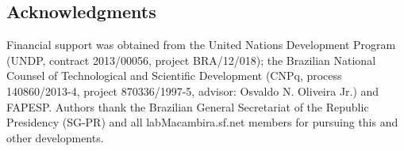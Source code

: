 \documentclass[a4paper, 11pt]{article} %
\begin{document}
\subsection*{Acknowledgments}
Financial support was obtained from 
the United Nations Development Program 
(UNDP, contract 2013/00056, project BRA/12/018);
the Brazilian National Counsel of Technological 
and Scientific Development (CNPq, process 140860/2013-4, project 870336/1997-5,
advisor: Osvaldo N. Oliveira Jr.) and FAPESP.
Authors thank
the Brazilian 
General Secretariat of the Republic Presidency (SG-PR) and 
all
labMacambira.sf.net members for pursuing this and other developments.

%
%
\end{document}
